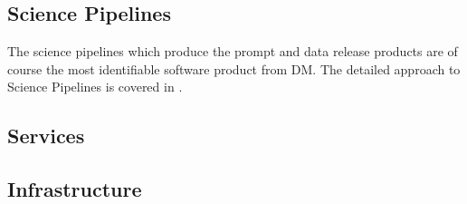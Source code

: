 \subsection{Science Pipelines}\label{sec:pipes}
The science pipelines which produce the prompt and data release products are of course the most identifiable
software product from DM.
The detailed approach to Science Pipelines is covered in \cite{PSTN-019}.



\subsection{Services}

\subsection{Infrastructure}
